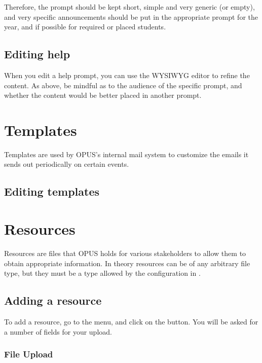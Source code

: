 \documentclass[12 pt]{book}
\begin{document}
Therefore, the  prompt should be kept short,
simple and very generic (or empty), and very specific announcements
should be put in the appropriate prompt for the year, and if possible
for required or placed students.

\subsection{Editing help}

When you edit a help prompt, you can use the WYSIWYG editor to refine
the content. As above, be mindful as to the audience of the specific
prompt, and whether the content would be better placed in another
prompt.

\section{Templates}
\label{Templates}

Templates are used by OPUS's internal mail system to customize the 
emails it sends out periodically on certain events.

\subsection{Editing templates}



\section{Resources}
\label{Resources}

Resources are files that OPUS holds for various stakeholders to allow
them to obtain appropriate information. In theory resources can be of
any arbitrary file type, but they must be a type allowed by the 
configuration in .

\subsection{Adding a resource}

To add a resource, go to the 
menu, and click on the  button. You will be asked for a
number of fields for your upload.

\subsubsection{File Upload}
\end{document}
